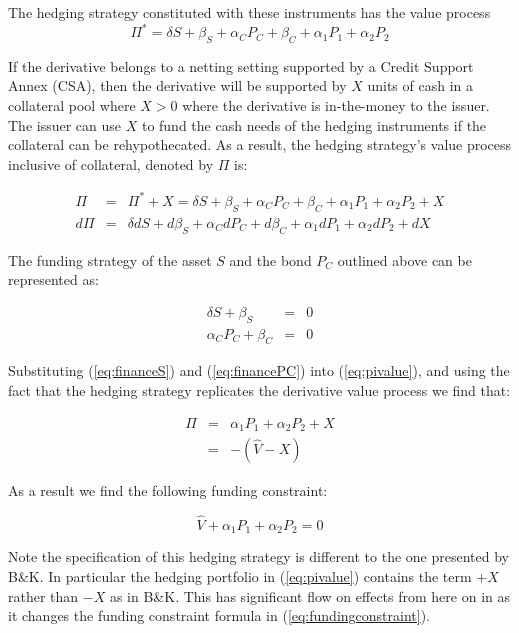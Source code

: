 \documentclass{tufte-handout}
\begin{document}
The hedging strategy constituted with these instruments has the value process
\begin{equation}
  \Pi^* = \delta S + \beta_S + \alpha_C P_C + \beta_C + \alpha_1 P_1 + \alpha_2 P_2
\end{equation}

If the derivative belongs to a netting setting supported by a Credit Support
Annex (CSA), then the derivative will be supported by $X$ units of cash in
a collateral pool where $X>0$ where the derivative is in-the-money to the issuer.
The issuer can use $X$ to fund the cash needs of the hedging instruments if
the collateral can be rehypothecated. As a result, the hedging strategy's value
process inclusive of collateral, denoted by $\Pi$ is:

\begin{eqnarray}
  \Pi & = & \Pi^* + X = \delta S + \beta_S + \alpha_C P_C + \beta_C +
          \alpha_1 P_1 + \alpha_2 P_2 + X \label{eq:pivalue} \\
  d\Pi & = & \delta dS + d\beta_S + \alpha_C dP_C + d\beta_C +
          \alpha_1 dP_1 + \alpha_2 dP_2 + dX \label{eq:pidelta}
\end{eqnarray}

The funding strategy of the asset $S$ and the bond $P_C$ outlined above can be
represented as:

\begin{eqnarray}
  \delta S + \beta_S & = & 0 \label{eq:financeS} \\
  \alpha_C P_C + \beta_C & = & 0 \label{eq:financePC}
\end{eqnarray}

Substituting (\ref{eq:financeS}) and (\ref{eq:financePC}) into (\ref{eq:pivalue}),
and using the fact that the hedging strategy replicates the derivative value
process we find that:

\begin{eqnarray*}
  \Pi & = & \alpha_1 P_1 + \alpha_2 P_2 + X \\
      & = & -(\hat{V} - X)
\end{eqnarray*}

As a result we find the following funding constraint:

\begin{equation}\label{eq:fundingconstraint}
  \hat{V} + \alpha_1 P_1 + \alpha_2 P_2 = 0
\end{equation}

Note the specification of this hedging strategy is different to the one
presented by B\&K. In particular the hedging portfolio in (\ref{eq:pivalue})
contains the term $+X$ rather than $-X$ as in B\&K. This has significant flow on effects
from here on in as it changes the funding constraint formula in (\ref{eq:fundingconstraint}).
\end{document}
